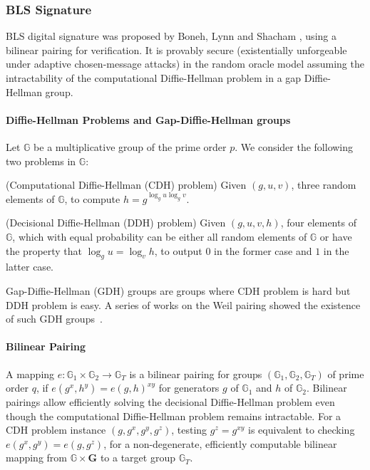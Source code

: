 \subsubsection{BLS Signature}
BLS digital signature was proposed by Boneh, Lynn and Shacham \cite{DBLP:journals/joc/BonehLS04}, using a bilinear pairing for verification. It is provably secure (existentially unforgeable under adaptive chosen-message attacks) in the random oracle model assuming the intractability of the computational Diffie-Hellman problem in a gap Diffie-Hellman group. 

\paragraph{Diffie-Hellman Problems and Gap-Diffie-Hellman groups} Let $\mathbb{G}$ be a multiplicative group of the prime order $p$. We consider the following two problems in $\mathbb{G}$:
\begin{definition} {(Computational Diffie-Hellman (CDH) problem)} 
    Given $(g, u, v)$, three random elements of $\mathbb{G}$, to compute $h=g^{\log_g u \log_g v}$. 
\end{definition}

\begin{definition} {(Decisional Diffie-Hellman (DDH) problem)}
    Given $(g, u, v, h)$, four elements of $\mathbb{G}$, which with equal probability can be either all random elements of $\mathbb{G}$ or have the property that $\log_g u = \log_v h$, to output $0$ in the former case and $1$ in the latter case. 
\end{definition}

Gap-Diffie-Hellman (GDH) groups are groups where CDH problem is hard but DDH problem is easy. A series of works on the Weil pairing showed the existence of such GDH groups~\cite{DBLP:conf/crypto/BonehF01}. 

\paragraph{Bilinear Pairing} A mapping $e: \mathbb{G}_1\times \mathbb{G}_2\to \mathbb{G}_T$ is a bilinear pairing for groups $(\mathbb{G}_1, \mathbb{G}_2, \mathbb{G}_T)$ of prime order $q$, if $e(g^x, h^y) = e(g, h)^{xy}$ for generators $g$ of $\mathbb{G}_1$ and $h$ of $\mathbb{G}_2$. Bilinear pairings allow efficiently solving the decisional Diffie-Hellman problem even though the computational Diffie-Hellman problem remains intractable. For a CDH problem instance $(g, g^x, g^y, g^z)$, testing $g^z=g^{xy}$ is equivalent to checking $e(g^x, g^y) = e(g, g^z)$, for a non-degenerate, efficiently computable bilinear mapping from $\mathbb{G}\times \mathbf{G}$ to a target group $\mathbb{G}_T$. 

